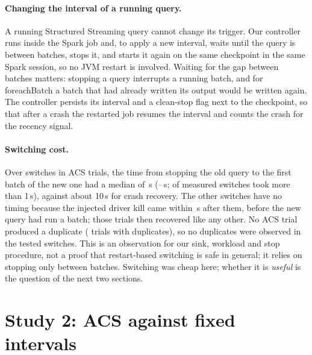 \documentclass[10pt,twocolumn]{article}
\begin{document}
\paragraph{Changing the interval of a running query.}
A running Structured Streaming query cannot change its trigger. Our controller
runs inside the Spark job and, to apply a new interval, waits until the query is
between batches, stops it, and starts it again on the same checkpoint in the
same Spark session, so no JVM restart is involved. Waiting for the gap between
batches matters: stopping a query interrupts a running batch, and for
foreachBatch a batch that had already written its output would be written again.
The controller persists its interval and a clean-stop flag next to the
checkpoint, so that after a crash the restarted job resumes the interval and
counts the crash for the recency signal.

\paragraph{Switching cost.}
Over \Switches{} switches in \ACSTrialsClean{} ACS trials, the time from stopping
the old query to the first batch of the new one had a median of \SwitchMed\,s
(\SwitchMin--\SwitchMax\,s; \SwitchOverOne{} of \SwitchN{} measured switches took
more than 1\,s), against about 10\,s for crash recovery. The other
\SwitchKilled{} switches have no timing because the injected driver kill came
within \SwitchKilledMax\,s after them, before the new query had run a batch;
those trials then recovered like any other. No ACS trial produced a duplicate
(\ACSDupTrials{} trials with duplicates), so no duplicates were observed in the
tested switches. This is an observation for our sink, workload and stop
procedure, not a proof that restart-based switching is safe in general; it
relies on stopping only between batches. Switching was cheap here; whether it is
\emph{useful} is the question of the next two sections.

\section{Study 2: ACS against fixed intervals}
\label{sec:study2}
\end{document}
